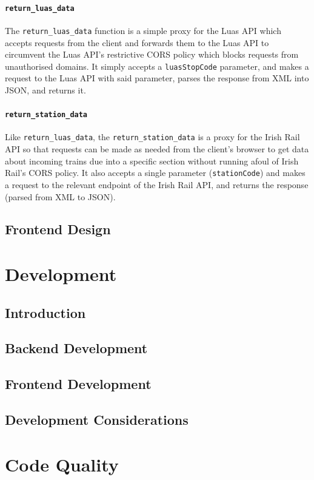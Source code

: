 \documentclass[a4paper,11pt]{report}
\begin{document}
\subsubsection{\texttt{return_luas_data}}
The \verb|return_luas_data| function is a simple proxy for the Luas API which accepts requests from the client and forwards them to the Luas API to circumvent the Luas API's restrictive CORS policy which blocks requests from unauthorised domains.
It simply accepts a \verb|luasStopCode| parameter, and makes a request to the Luas API with said parameter, parses the response from XML into JSON, and returns it.

\subsubsection{\texttt{return_station_data}}
Like \verb|return_luas_data|, the \verb|return_station_data| is a proxy for the Irish Rail API so that requests can be made as needed from the client's browser to get data about incoming trains due into a specific section without running afoul of Irish Rail's CORS policy.
It also accepts a single parameter (\verb|stationCode|) and makes a request to the relevant endpoint of the Irish Rail API, and returns the response (parsed from XML to JSON).


\section{Frontend Design}

\chapter{Development}
\section{Introduction}
\section{Backend Development}
\section{Frontend Development}
\section{Development Considerations}

\chapter{Code Quality}
\end{document}
